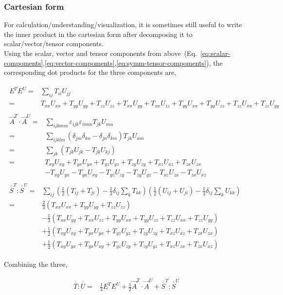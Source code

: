 \documentclass[10pt,fleqn]{article}
\newcommand{\eqar}[1]
{
  \begin{align}
    #1
  \end{align}
}
\newcommand{\paren}[1]{{\left({#1}\right)}}
\begin{document}
\subsubsection{Cartesian form}
For calculation/understanding/visualization, it is sometimes still useful to write
the inner product in the cartesian form after decomposing it to
scalar/vector/tensor components.\\

Using the scalar, vector and tensor components from above~(Eq.~\ref{eq:scalar-compoments},\ref{eq:vector-compoments},\ref{eq:symm-tensor-compoments}),
the corresponding dot products for the three components are,
\eqar{
  \begin{split}
    E^{T}E^{U}=&\sum_{ij}T_{ii}U_{jj}\\
    =&T_{xx}U_{xx}+T_{yy}U_{yy}+T_{zz}U_{zz}
       +T_{xx}U_{yy}+T_{xx}U_{zz}+T_{yy}U_{xx}+T_{yy}U_{zz}+T_{zz}U_{xx}+T_{zz}U_{yy}
  \end{split}\\
  \begin{split}
    \vec A^{T}\cdot\vec A^{U}=&\sum_{ijkmm}\varepsilon_{ijk}\varepsilon_{imm}T_{jk}U_{mn}\\
    =&\sum_{ijklm}\paren{\delta_{jm}\delta_{kn}-\delta_{jn}\delta_{km}}T_{jk}U_{mn}\\
    =&\sum_{jk}\paren{T_{jk}U_{jk}-T_{jk}U_{kj}}\\
    =&T_{xy}U_{xy}+T_{yx}U_{yx}+T_{yz}U_{yz}+T_{zy}U_{zy}+T_{xz}U_{xz}+T_{zx}U_{zx}\\&
    -T_{xy}U_{yx}-T_{yx}U_{xy}-T_{yz}U_{zy}-T_{zy}U_{yz}-T_{xz}U_{zx}-T_{zx}U_{xz}
  \end{split}\\
  \begin{split}
    \overline{\overline{S}}^{T}:\overline{\overline{S}}^{U}=&\sum_{ij}\paren{\frac12\paren{T_{ij}+T_{ji}}-\frac13\delta_{ij}\sum_{k}T_{kk}}
       \paren{\frac12\paren{U_{ij}+U_{ji}}-\frac13\delta_{ij}\sum_{k}U_{kk}}\\
    =&\frac23\paren{T_{xx}U_{xx}+T_{yy}U_{yy}+T_{zz}U_{zz}}\\&
    -\frac13\paren{T_{xx}U_{yy}+T_{xx}U_{zz}+T_{yy}U_{xx}+T_{yy}U_{zz}+T_{zz}U_{xx}+T_{zz}U_{yy}}\\&
    +\frac12\paren{T_{xy}U_{xy}+T_{yx}U_{yx}+T_{yz}U_{yz}+T_{zy}U_{zy}+T_{xz}U_{xz}+T_{zx}U_{zx}}\\&
    +\frac12\paren{T_{xy}U_{yx}+T_{yx}U_{xy}+T_{yz}U_{zy}+T_{zy}U_{yz}+T_{xz}U_{zx}+T_{zx}U_{xz}}
  \end{split}
}
Combining the three,
\eqar{
  \begin{split}
    \overline{\overline{T}}:\overline{\overline{U}}=&\frac13E^{T}E^{U}+\frac12\vec A^{T}\cdot\vec A^{U}+\overline{\overline{S}}^{T}:\overline{\overline{S}}^{U}
  \end{split}
}
\end{document}
